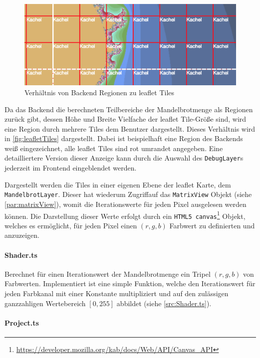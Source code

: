 \begin{figure}[h!]
	\centering
	\includegraphics[width=0.5\linewidth]{img/Implementierung/leafletTiles}
	\caption{Verhältnis von Backend Regionen zu leaflet Tiles}
	\label{fig:leafletTiles}
\end{figure}
Da das Backend die berechneten Teilbereiche der Mandelbrotmenge als Regionen zurück gibt, dessen Höhe und Breite 
Vielfache der leaflet Tile-Größe sind, wird eine Region durch mehrere Tiles dem Benutzer dargestellt.
Dieses Verhältnis wird in \autoref{fig:leafletTiles} dargestellt. Dabei ist beispielhaft eine Region des Backends
weiß eingezeichnet, alle leaflet Tiles sind rot umrandet angegeben. Eine detailliertere Version dieser Anzeige kann
durch die Auswahl des \verb|DebugLayer|s jederzeit im Frontend eingeblendet werden.

Dargestellt werden die Tiles in einer eigenen Ebene der leaflet Karte, dem \verb|MandelbrotLayer|. 
Dieser hat wiederum Zugriffauf das \verb|MatrixView| Objekt (siehe \autoref{par:matrixView}), womit die 
Iterationswerte für jeden Pixel ausgelesen werden können. Die Darstellung dieser Werte erfolgt durch ein 
\verb|HTML5 canvas|\footnote{\url{https://developer.mozilla.org/kab/docs/Web/API/Canvas_API}} Objekt, welches es
ermöglicht, für jeden Pixel einen \( (r,g,b) \) Farbwert zu definierten und anzuzeigen.

\paragraph{Shader.ts} Berechnet für einen Iterationswert der Mandelbrotmenge ein Tripel \( (r,g,b) \) von Farbwerten.
Implementiert ist eine simple Funktion, welche den Iterationswert für jeden Farbkanal mit einer Konstante multipliziert 
und auf den zulässigen ganzzahligen Wertebereich \( [0,255] \) abbildet (siehe \autoref{src:Shader.ts}).

\begin{figure}[h!]
	
\end{figure}

\paragraph{Project.ts}

